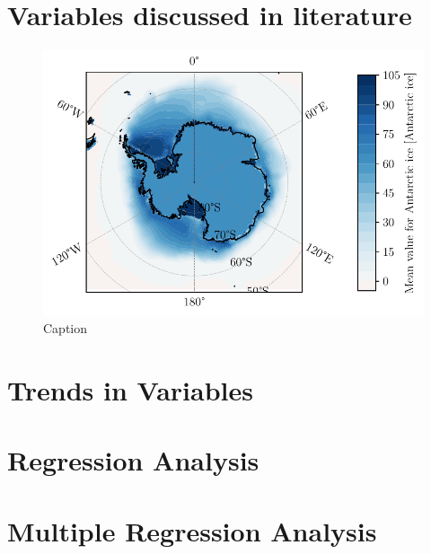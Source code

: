 \documentclass[../main.tex]{subfiles}
\begin{document}
\section{Variables discussed in literature}
\begin{figure}[hbt!]
    \centering
    \includegraphics{images/T2/mean_spatial/hres/ICE}
    \caption{Caption}
    \label{fig:mean_spatial_LIC}
\end{figure}

\section{Trends in Variables}

\section{Regression Analysis}

\section{Multiple Regression Analysis}
\end{document}

